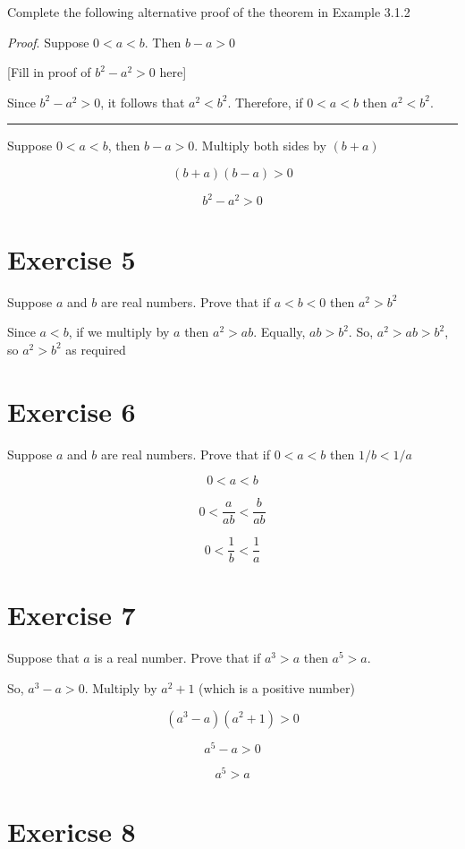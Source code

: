 \documentclass[11pt]{article}
\begin{document}
Complete the following alternative proof of the theorem in Example 3.1.2

\textit{Proof}. Suppose $0 < a < b$. Then $b - a > 0$

[Fill in proof of $b^2 - a^2 > 0$ here]

Since $b^2 - a^2 > 0$, it follows that $a^2 < b^2$. Therefore, if $0 < a < b$
then $a^2 < b^2$.

\vspace{5pt}
\hrule
\vspace{5pt}

Suppose $0 < a < b$, then $b - a > 0$. Multiply both sides by $(b + a)$

$$(b + a)(b - a) > 0$$

$$b^2 - a^2 > 0$$

\section*{Exercise 5}

Suppose $a$ and $b$ are real numbers. Prove that if $a < b < 0$ then $a^2 > b^2$

Since $a < b$, if we multiply by $a$ then $a^2 > ab$. Equally, $ab > b^2$. 
So, $a^2 > ab > b^2$, so $a^2 > b^2$ as required

\section*{Exercise 6}

Suppose $a$ and $b$ are real numbers. Prove that if $0 < a < b$ then $1/b < 1/a$

$$0 < a < b$$

$$0 < \frac{a}{ab} < \frac{b}{ab}$$

$$0 < \frac{1}{b} < \frac{1}{a}$$

\section*{Exercise 7}

Suppose that $a$ is a real number. Prove that if $a^3 > a$ then $a^5 > a$.

So, $a^3 - a > 0$. Multiply by $a^2 + 1$ (which is a positive number)

$$(a^3 - a)(a^2 + 1) > 0$$

$$a^5 - a > 0$$

$$a^5 > a$$

\section*{Exericse 8}
\end{document}
